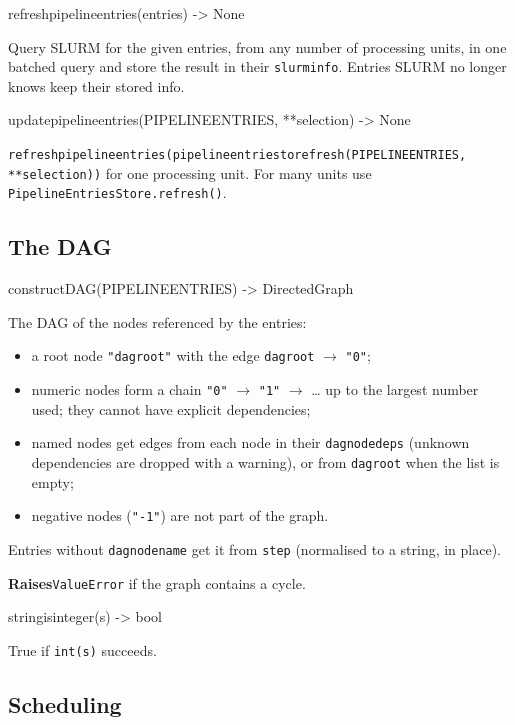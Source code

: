 \documentclass[11pt,a4paper]{article}
\newcommand{\api}[1]{%
  \par\medskip
  \begin{tcolorbox}[colback=sigbg, colframe=sigbg, boxrule=0pt, arc=1pt, left=4pt, right=4pt, top=2pt, bottom=2pt, breakable]
  \raggedright\ttfamily\small #1
  \end{tcolorbox}\nopagebreak\vspace{-4pt}%
}
\DeclareRobustCommand{\_}{\textunderscore\allowbreak}
\newcommand{\cmd}[1]{\texttt{#1}}
\newcommand{\raises}{\par\textsf{\small\bfseries Raises}\quad}
\begin{document}
\api{refresh\_pipeline\_entries(entries) -> None}
Query SLURM for the given entries, from any number of processing units, in one batched query and
store the result in their \cmd{slurm\_info}. Entries SLURM no longer knows keep their stored info.

\api{update\_pipeline\_entries(PIPELINE\_ENTRIES, **selection) -> None}
\cmd{refresh\_pipeline\_entries(pipeline\_entries\_to\_refresh(PIPELINE\_ENTRIES, **selection))}
for one processing unit. For many units use \cmd{PipelineEntriesStore.refresh()}.

\subsection{The DAG}\label{sec:dag}

\api{constructDAG(PIPELINE\_ENTRIES) -> DirectedGraph}
The DAG of the nodes referenced by the entries:
\begin{itemize}
  \item a root node \cmd{"dag\_root"} with the edge \cmd{dag\_root} $\rightarrow$ \cmd{"0"};
  \item numeric nodes form a chain \cmd{"0"} $\rightarrow$ \cmd{"1"} $\rightarrow$ \ldots{} up to the
    largest number used; they cannot have explicit dependencies;
  \item named nodes get edges from each node in their \cmd{dag\_node\_deps} (unknown dependencies are
    dropped with a warning), or from \cmd{dag\_root} when the list is empty;
  \item negative nodes (\cmd{"-1"}) are not part of the graph.
\end{itemize}
Entries without \cmd{dag\_node\_name} get it from \cmd{step} (normalised to a string, in place).
\raises \cmd{ValueError} if the graph contains a cycle.

\api{string\_is\_integer(s) -> bool}
True if \cmd{int(s)} succeeds.

\subsection{Scheduling}
\end{document}
